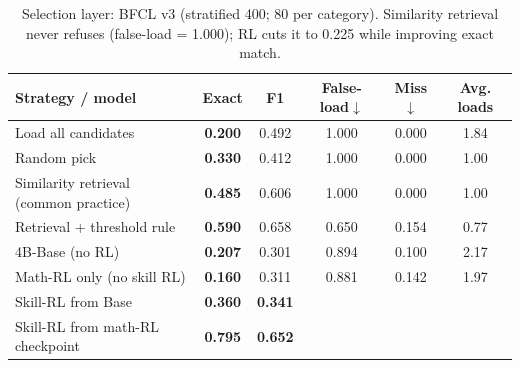 
\begin{table}[t]
  \centering
  \caption{Selection layer: BFCL v3 (stratified 400; 80 per category). Similarity retrieval never refuses (false-load = 1.000); RL cuts it to 0.225 while improving exact match.}
  \label{tab:bfcl}
  \begin{tabular}{lccccc}
    \toprule
    Strategy / model & Exact & F1 & False-load$\downarrow$ & Miss$\downarrow$ & Avg. loads \\
    \midrule
    Load all candidates & \textbf{0.200} & 0.492 & 1.000 & 0.000 & 1.84 \\
    Random pick & \textbf{0.330} & 0.412 & 1.000 & 0.000 & 1.00 \\
    Similarity retrieval (common practice) & \textbf{0.485} & 0.606 & 1.000 & 0.000 & 1.00 \\
    Retrieval + threshold rule & \textbf{0.590} & 0.658 & 0.650 & 0.154 & 0.77 \\
    4B-Base (no RL) & \textbf{0.207} & 0.301 & 0.894 & 0.100 & 2.17 \\
    Math-RL only (no skill RL) & \textbf{0.160} & 0.311 & 0.881 & 0.142 & 1.97 \\
    Skill-RL from Base & \textbf{0.360} & \textbf{0.341} \\
    Skill-RL from math-RL checkpoint & \textbf{0.795} & \textbf{0.652} \\
    \bottomrule
  \end{tabular}
\end{table}
